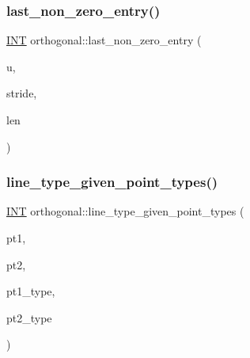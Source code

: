 \subsubsection{\texorpdfstring{last\+\_\+non\+\_\+zero\+\_\+entry()}{last\_non\_zero\_entry()}}
{\footnotesize\ttfamily \mbox{\hyperlink{galois_8h_a09fddde158a3a20bd2dcadb609de11dc}{I\+NT}} orthogonal\+::last\+\_\+non\+\_\+zero\+\_\+entry (\begin{DoxyParamCaption}\item[{\mbox{\hyperlink{galois_8h_a09fddde158a3a20bd2dcadb609de11dc}{I\+NT}} $\ast$}]{u,  }\item[{\mbox{\hyperlink{galois_8h_a09fddde158a3a20bd2dcadb609de11dc}{I\+NT}}}]{stride,  }\item[{\mbox{\hyperlink{galois_8h_a09fddde158a3a20bd2dcadb609de11dc}{I\+NT}}}]{len }\end{DoxyParamCaption})}

\mbox{\label{classorthogonal_abffd6b3e0d545fbe7799a2e2c1038aba}} 
\subsubsection{\texorpdfstring{line\+\_\+type\+\_\+given\+\_\+point\+\_\+types()}{line\_type\_given\_point\_types()}}
{\footnotesize\ttfamily \mbox{\hyperlink{galois_8h_a09fddde158a3a20bd2dcadb609de11dc}{I\+NT}} orthogonal\+::line\+\_\+type\+\_\+given\+\_\+point\+\_\+types (\begin{DoxyParamCaption}\item[{\mbox{\hyperlink{galois_8h_a09fddde158a3a20bd2dcadb609de11dc}{I\+NT}}}]{pt1,  }\item[{\mbox{\hyperlink{galois_8h_a09fddde158a3a20bd2dcadb609de11dc}{I\+NT}}}]{pt2,  }\item[{\mbox{\hyperlink{galois_8h_a09fddde158a3a20bd2dcadb609de11dc}{I\+NT}}}]{pt1\+\_\+type,  }\item[{\mbox{\hyperlink{galois_8h_a09fddde158a3a20bd2dcadb609de11dc}{I\+NT}}}]{pt2\+\_\+type }\end{DoxyParamCaption})}

\mbox{\label{classorthogonal_aa3249c7fddbc156af817fb274e41c914}} 
